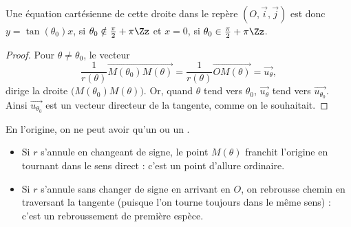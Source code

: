 \documentclass[class=report,crop=false]{standalone}
\begin{document}
Une équation cartésienne de cette
droite dans le repère $(O,\overrightarrow{i},\overrightarrow{j})$
est donc $y=\tan(\theta_0)x$, si $\theta_0\notin\frac{\pi}{2}+\pi\Zz$
et $x=0$, si $\theta_0\in\frac{\pi}{2}+\pi\Zz$.


\begin{proof}
Pour $\theta\neq\theta_0$, le vecteur
$$\frac{1}{r(\theta)}\overrightarrow{M(\theta_0)M(\theta)}=
\frac{1}{r(\theta)}\overrightarrow{OM(\theta)}
=\overrightarrow{u_\theta},$$
dirige la droite $\big(M(\theta_0)M(\theta)\big)$. Or, quand $\theta$
tend vers $\theta_0$, $\overrightarrow{u_\theta}$ tend vers
$\overrightarrow{u_{\theta_0}}$. Ainsi $\overrightarrow{u_{\theta_0}}$
est un vecteur directeur de la tangente, comme on le souhaitait.
\end{proof}







\begin{remarque*}
En l'origine, on ne peut avoir qu'un
 ou un .

\begin{itemize}
  \item Si $r$ s'annule en changeant de signe, le point $M(\theta)$
franchit l'origine en tournant dans le sens direct : c'est un
point d'allure ordinaire.

  \item Si $r$ s'annule sans changer de signe
en arrivant en $O$, on rebrousse chemin en traversant la tangente
(puisque l'on tourne toujours dans le même sens) : c'est un
rebroussement de première espèce.
\end{itemize}

\end{remarque*}
\end{document}
